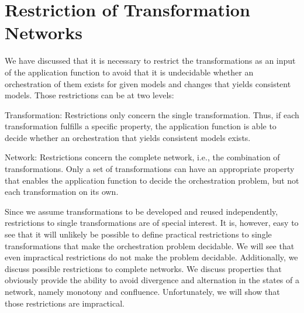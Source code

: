 
\section{Restriction of Transformation Networks}

We have discussed that it is necessary to restrict the transformations as an input of the application function to avoid that it is undecidable whether an orchestration of them exists for given models and changes that yields consistent models.
Those restrictions can be at two levels:
\begin{properdescription}
    \item[Transformation:] Restrictions only concern the single transformation. Thus, if each transformation fulfills a specific property, the application function is able to decide whether an orchestration that yields consistent models exists.
    \item[Network:] Restrictions concern the complete network, i.e., the combination of transformations. Only a set of transformations can have an appropriate property that enables the application function to decide the orchestration problem, but not each transformation on its own.
\end{properdescription}

Since we assume transformations to be developed and reused independently, restrictions to single transformations are of special interest.
It is, however, easy to see that it will unlikely be possible to define practical restrictions to single transformations that make the orchestration problem decidable.
We will see that even impractical restrictions do not make the problem decidable.
Additionally, we discuss possible restrictions to complete networks.
We discuss properties that obviously provide the ability to avoid divergence and alternation in the states of a network, namely monotony and confluence.
Unfortunately, we will show that those restrictions are impractical.



